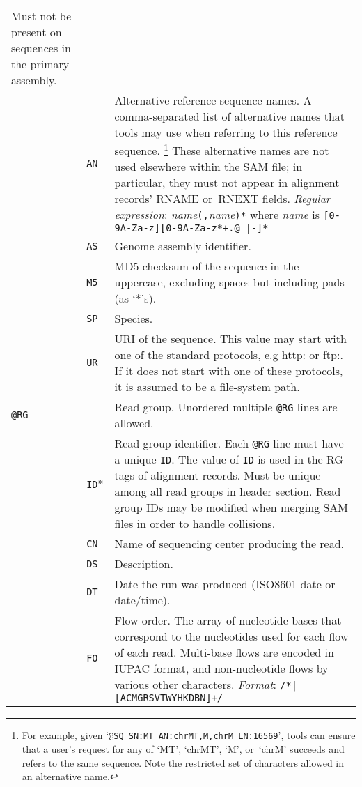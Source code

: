 \documentclass[10pt]{article}
\begin{document}
\begin{center}
\begin{longtable}{|l|l|p{13.5cm}|}
  Must not be present on sequences in the primary assembly.\\\cline{2-3}
  & {\tt AN} & Alternative reference sequence names.
A comma-separated list of alternative names that tools may use when referring
to this reference sequence.%
\footnote{For example, given `{\tt @SQ SN:MT AN:chrMT,M,chrM LN:16569}',
tools can ensure that a user's request for any of `MT', `chrMT', `M',
or~`chrM' succeeds and refers to the same sequence.
Note the restricted set of characters allowed in an alternative name.}
These alternative names are not used elsewhere within the SAM file;
in particular, they must not appear in alignment records' {\sf RNAME}
or~{\sf RNEXT} fields.
\emph{Regular expression}: \emph{name}{\tt (,}\emph{name}{\tt )*}
where \emph{name} is {\tt [0-9A-Za-z][0-9A-Za-z*+.@\_|-]*}\\\cline{2-3}
  & {\tt AS} & Genome assembly identifier. \\\cline{2-3}
  & {\tt M5} & MD5 checksum of the sequence in the uppercase, excluding spaces but including pads (as `*'s).\\\cline{2-3}
  & {\tt SP} & Species.\\\cline{2-3}
  & {\tt UR} & URI of the sequence.  This value may start with one of the standard
  protocols, e.g http: or ftp:.  If it does not start with one of these protocols, it is assumed to be a file-system path.\\\cline{1-3}
  \multicolumn{2}{|l}{\tt @RG} & Read group. Unordered multiple {\tt @RG} lines are allowed.\\\cline{2-3}
  & {\tt ID}* & Read group identifier. Each {\tt @RG} line must have a unique {\tt ID}. The value of {\tt ID}
  is used in the RG tags of alignment records. Must be unique among all read groups in header section.  Read group IDs may be modified when merging SAM files in order to handle collisions.\\\cline{2-3}
  & {\tt CN} & Name of sequencing center producing the read.\\\cline{2-3}
  & {\tt DS} & Description.\\\cline{2-3}
  & {\tt DT} & Date the run was produced (ISO8601 date or date/time).\\\cline{2-3}
  & {\tt FO} & Flow order. The array of nucleotide bases that correspond to the nucleotides used for each flow of each read.
  	Multi-base flows are encoded in IUPAC format, and non-nucleotide flows by various other characters. \emph{Format}: {\tt /\char92*|[ACMGRSVTWYHKDBN]+/}\\\cline{2-3}

\end{longtable}
\end{center}
\end{document}
